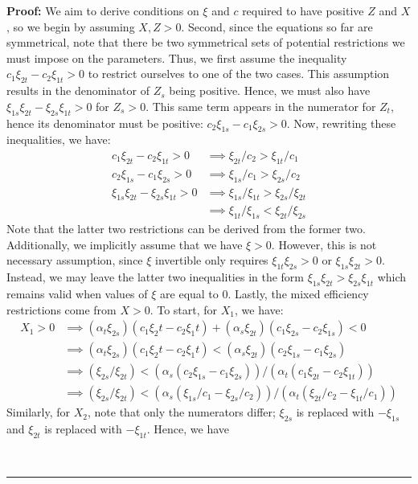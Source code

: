 \documentclass[12pt,a4paper]{extarticle}
\newenvironment{proof}[1][Proof]{\noindent\textbf{#1:} }{\ \rule{0.5em}{0.5em}}
\begin{document}
\begin{proof}
	We aim to derive conditions on $\xi$ and $c$ required to have positive $Z$ and $X$, so we begin by assuming $X, Z  > 0$. Second, since the equations so far are symmetrical, note that there be two symmetrical sets of potential restrictions we must impose on the parameters. Thus, we first assume the inequality $c_1 \xi_{2t} - c_2 \xi_{1t} > 0$ to restrict ourselves to one of the two cases. This assumption results in the denominator of $Z_s$ being positive. Hence, we must also have $\xi_{1s}\xi_{2t} - \xi_{2s}\xi_{1t} > 0 $ for $Z_s > 0$. This same term appears in the numerator for $Z_t$, hence its denominator must be positive: $c_2 \xi_{1s} - c_1 \xi_{2s} > 0$. Now, rewriting these inequalities, we have:
	\begin{align*}
	c_1 \xi_{2t} - c_2 \xi_{1t} > 0 &\implies \xi_{2t}/c_2 > \xi_{1t}/c_1 \\
	c_2 \xi_{1s} - c_1 \xi_{2s} > 0 &\implies \xi_{1s}/c_1 > \xi_{2s}/c_2 \\
	\xi_{1s}\xi_{2t} - \xi_{2s}\xi_{1t} > 0 &\implies \xi_{1s}/\xi_{1t} > \xi_{2s}/\xi_{2t} \\
	&\implies \xi_{1t}/\xi_{1s} < \xi_{2t}/\xi_{2s} 
	\end{align*}
	Note that the latter two restrictions can be derived from the former two. Additionally, we implicitly assume that we have $\xi > 0$. However, this is not necessary assumption, since $\xi$ invertible only requires $\xi_{1t} \xi_{2s} > 0$ or $\xi_{1s} \xi_{2t} > 0$. Instead, we may leave the latter two inequalities in the form $ \xi_{1s}\xi_{2t} > \xi_{2s}\xi_{1t}$ which remains valid when values of $\xi$ are equal to $0$. Lastly, the mixed efficiency restrictions come from $X > 0$. To start, for $X_1$, we have:
	\begin{align*}
	X_1 > 0 &\implies (\alpha_t \xi_{2s})(c_1 \xi_2t - c_2\xi_1t) + (\alpha_s \xi_{2t})(c_1 \xi_{2s} - c_2 \xi_{1s}) < 0\\
	&\implies (\alpha_t \xi_{2s})(c_1 \xi_2t - c_2\xi_1t) < (\alpha_s \xi_{2t})(c_2 \xi_{1s} - c_1 \xi_{2s}) \\
	&\implies (\xi_{2s}/\xi_{2t}) < (\alpha_s (c_2 \xi_{1s} - c_1 \xi_{2s}))/(\alpha_t(c_1 \xi_{2t} - c_2\xi_{1t})) \\
	&\implies (\xi_{2s}/\xi_{2t}) < (\alpha_s (\xi_{1s}/c_1 -  \xi_{2s}/c_2))/(\alpha_t(\xi_{2t}/c_2 - \xi_{1t}/c_1)) 
	\end{align*}
	Similarly, for $X_2$, note that only the numerators differ; $\xi_{2s}$ is replaced with $-\xi_{1s}$ and $\xi_{2t}$ is replaced with $-\xi_{1t}$. Hence, we have

\end{proof}
\end{document}
